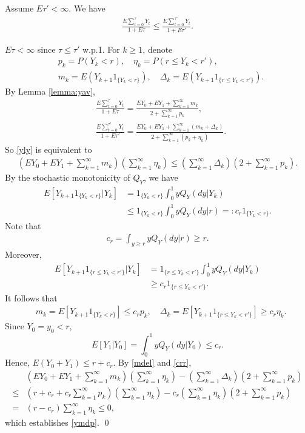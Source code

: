 \documentclass[graybox]{svmult}
\begin{document}
\begin{lemma} \label{lemma:tatap}
Assume $E\tau'<\infty$.
We have
\begin{align}
\frac{E\sum_{t=0}^\tau Y_t}{1+E\tau } \le
\frac{E\sum_{t=0}^{\tau'} Y_t}{1+E\tau' }. \label{yly}
\end{align}
\end{lemma}


\proof  $E\tau<\infty$ since $\tau\le \tau'$ w.p.1.
 For $k\ge 1$,  denote
\begin{align*}
&p_k= P(Y_k<r), \quad \eta_k=P(r\le Y_k< r'),\\
& m_k=
E(Y_{k+1} 1_{\{Y_k<r\}}),\quad
\Delta_k= E(Y_{k+1} 1_{\{r\le Y_k<r'\}}).
\end{align*}
By Lemma \ref{lemma:yav},
\begin{align*}
&\frac{E\sum_{t=0}^\tau Y_t}{1+E\tau }=\frac{EY_0+EY_1+
\sum_{k=1}^\infty m_k}{2+\sum_{k=1}^\infty  p_k},\\
& \frac{E\sum_{t=0}^{\tau'} Y_t}{1+E\tau' }=
\frac{EY_0+EY_1+ \sum_{k=1}^\infty (m_k+\Delta_k)}{2+
\sum_{k=1}^\infty  (p_k+\eta_k)}.
\end{align*}
So \eqref{yly} is equivalent to
\begin{align}
(EY_0+EY_1+\sum_{k=1}^\infty m_k)(\sum_{k=1}^\infty \eta_k)  \le (\sum_{k=1}^\infty \Delta_k) (2+\sum_{k=1}^\infty  p_k). \label{ymdp}
\end{align}
By the stochastic monotonicity of $Q_Y$, we have
\begin{align*}
E[Y_{k+1} 1_{\{Y_k<r\}} |Y_k] &= 1_{\{Y_k<r\}} \int_0^1 y Q_Y(dy|Y_k)\\
&\le  1_{\{Y_k<r\}}\int_0^1 y Q_Y(dy|r)=: c_r1_{\{Y_k<r\}}.
\end{align*}
Note that
\begin{align}
c_r=\int_{y\ge r} yQ_Y(dy|r)\ge r. \label{crr}
\end{align}
Moreover,
\begin{align*}
E[Y_{k+1} 1_{\{r\le Y_k<r'\}}|Y_k]&=1_{\{r\le Y_k<r'\}}\int_0^1 y
 Q_Y(dy|Y_k) \\
& \ge c_r 1_{\{r\le Y_k<r'\}} .
\end{align*}
It follows that
\begin{align}
&m_k=E[Y_{k+1} 1_{\{Y_k<r\}}] \le c_r p_k, \quad \Delta_k=E[Y_{k+1} 1_{\{r\le Y_k<r'\}}]\ge c_r \eta_k . \label{mdel}
\end{align}
Since $Y_0=y_0<r$,
$$ E[Y_1|Y_0]= \int_0^1 y Q_Y(dy|Y_0)\le c_r.$$
Hence, $E(Y_0+Y_1)\le r+c_r $.  By \eqref{mdel} and \eqref{crr},
 \begin{align*}
&  (EY_0+EY_1+\sum_{k=1}^\infty m_k)(\sum_{k=1}^\infty \eta_k)  - (\sum_{k=1}^\infty \Delta_k) (2+\sum_{k=1}^\infty  p_k)\\
\le &  (r+c_r+c_r \sum_{k=1}^\infty p_k) (\sum_{k=1}^\infty \eta_k) - c_r (\sum_{k=1}^\infty \eta_k)
(2+\sum_{k=1}^\infty p_k)  \\
=& (r-c_r) \sum_{k=1}^\infty \eta_k
\le 0,
\end{align*}
which establishes  \eqref{ymdp}. \qed
\end{document}

